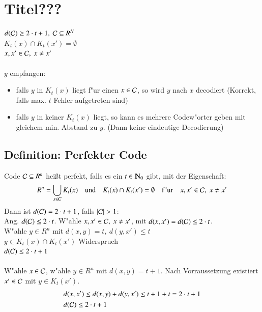 \section{Titel???}

$d(\mathcal{C}) \geq 2 \cdot t + 1,\ \mathcal{C} \subseteq R^N$ \\
$K_t(x) \cap K_t(x')=\emptyset$ \\
$x, x' \in \mathcal{C},\ x \neq x'$ \\
\\
$y$ empfangen:
\begin{itemize}
\item falls $y$ in $K_t(x)$ liegt f"ur einen $x \in \mathcal{C}$, so wird $y$ nach $x$ decodiert (Korrekt, falls max. $t$ Fehler aufgetreten sind)
\item  falls $y$ in keiner $K_t(x)$ liegt, so kann es mehrere Codew"orter geben mit gleichem min. Abstand zu $y$. (Dann keine eindeutige  Decodierung)
\end{itemize}

\subsection{Definition: Perfekter Code}
Code $\mathcal{C} \subseteq R^n$ hei\ss t perfekt, falls es ein $t \in \N_0$ gibt, mit der Eigenschaft:
\[
	R^n = \bigcup_{x \in \mathcal{C}} K_t(x) \quad \text{und} \quad K_t(x) \cap K_t(x') = \emptyset \quad \text{f"ur}\quad x,x' \in \mathcal{C},\ x \neq x'
\]
Dann ist $d(\mathcal{C})=2 \cdot t + 1$, falls $\left| \mathcal{C} \right| > 1$: \\
Ang. $d(\mathcal{C}) \leq 2\cdot t$. W"ahle $x,x' \in \mathcal{C},\ x \neq x'$, mit $d(x,x') = d(\mathcal{C}) \leq 2 \cdot t$. \\
W"ahle $y \in R^n$ mit $d(x,y)=t,\ d(y,x') \leq t$\\
$y \in K_t(x) \cap K_t(x')$ Widerspruch\\
$d(\mathcal{C}) \leq 2 \cdot t + 1$ \\
\\
W"ahle $x \in \mathcal{C}$, w"ahle $y \in R^n$ mit $d(x,y)=t+1$. Nach Vorraussetzung existiert $x' \in \mathcal{C}$ mit $y \in K_t(x')$. 
\begin{align*}
	&d(x,x') \leq d(x,y) + d(y,x') \leq t+1+t = 2 \cdot t + 1 \\
	&d(\mathcal{C}) \leq 2\cdot t + 1
\end{align*}	

